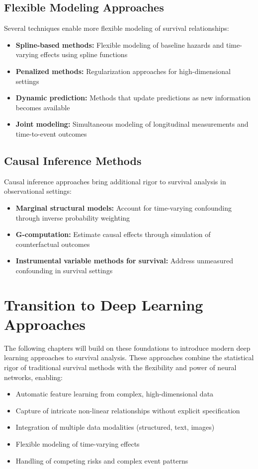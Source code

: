 \subsection{Flexible Modeling Approaches}

Several techniques enable more flexible modeling of survival relationships:
\begin{itemize}
    \item \textbf{Spline-based methods:} Flexible modeling of baseline hazards and time-varying effects using spline functions
    \item \textbf{Penalized methods:} Regularization approaches for high-dimensional settings
    \item \textbf{Dynamic prediction:} Methods that update predictions as new information becomes available
    \item \textbf{Joint modeling:} Simultaneous modeling of longitudinal measurements and time-to-event outcomes
\end{itemize}

\subsection{Causal Inference Methods}

Causal inference approaches bring additional rigor to survival analysis in observational settings:
\begin{itemize}
    \item \textbf{Marginal structural models:} Account for time-varying confounding through inverse probability weighting
    \item \textbf{G-computation:} Estimate causal effects through simulation of counterfactual outcomes
    \item \textbf{Instrumental variable methods for survival:} Address unmeasured confounding in survival settings
\end{itemize}

\section{Transition to Deep Learning Approaches}

The following chapters will build on these foundations to introduce modern deep learning approaches to survival analysis. These approaches combine the statistical rigor of traditional survival methods with the flexibility and power of neural networks, enabling:
\begin{itemize}
    \item Automatic feature learning from complex, high-dimensional data
    \item Capture of intricate non-linear relationships without explicit specification
    \item Integration of multiple data modalities (structured, text, images)
    \item Flexible modeling of time-varying effects
    \item Handling of competing risks and complex event patterns
\end{itemize}

